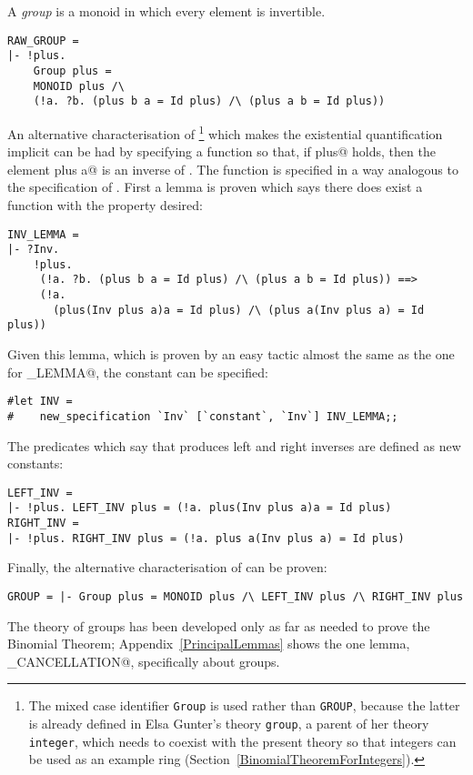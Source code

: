 A {\em group} is a monoid in which every element is invertible.
\begin{session}
\begin{verbatim}
RAW_GROUP =
|- !plus.
    Group plus =
    MONOID plus /\
    (!a. ?b. (plus b a = Id plus) /\ (plus a b = Id plus))
\end{verbatim}
\end{session}
An alternative characterisation of \verb@Group@\footnote{The mixed
  case identifier \texttt{Group} is used rather than \texttt{GROUP},
  because the latter is already defined in Elsa Gunter's theory
  \texttt{group}, a parent of her theory \texttt{integer}, which needs
  to coexist with the present theory so that integers can be used as
  an example ring (Section~\ref{BinomialTheoremForIntegers}).} which
makes the existential quantification implicit can be had by specifying
a function \verb@Inv@ so that, if \verb@Group plus@ holds, then the
element \verb@Inv plus a@ is an inverse of \verb@a@.  The function
\verb@Inv@ is specified in a way analogous to the specification of
\verb@Id@.  First a lemma is proven which says there does exist a
function \verb@Inv@ with the property desired:
\begin{session}
\begin{verbatim}
INV_LEMMA =
|- ?Inv.
    !plus.
     (!a. ?b. (plus b a = Id plus) /\ (plus a b = Id plus)) ==>
     (!a.
       (plus(Inv plus a)a = Id plus) /\ (plus a(Inv plus a) = Id plus))
\end{verbatim}
\end{session}
Given this lemma, which is proven by an easy tactic almost the same
as the one for \verb@ID_LEMMA@, the constant \verb@Inv@ can be specified:
\begin{session}
\begin{verbatim}
#let INV =
#    new_specification `Inv` [`constant`, `Inv`] INV_LEMMA;;
\end{verbatim}
\end{session}
The predicates which say that \verb@Inv@ produces left and right inverses
are defined as new constants:
\begin{session}
\begin{verbatim}
LEFT_INV =
|- !plus. LEFT_INV plus = (!a. plus(Inv plus a)a = Id plus)
RIGHT_INV =
|- !plus. RIGHT_INV plus = (!a. plus a(Inv plus a) = Id plus)
\end{verbatim}
\end{session}
Finally, the alternative characterisation of \verb@Group@ can be proven:
\begin{session}
\begin{verbatim}
GROUP = |- Group plus = MONOID plus /\ LEFT_INV plus /\ RIGHT_INV plus
\end{verbatim}
\end{session}
The theory of groups has been developed only as far as needed to prove
the Binomial Theorem; Appendix~\ref{PrincipalLemmas} shows the one lemma,
\verb@RIGHT_CANCELLATION@, specifically about groups.

